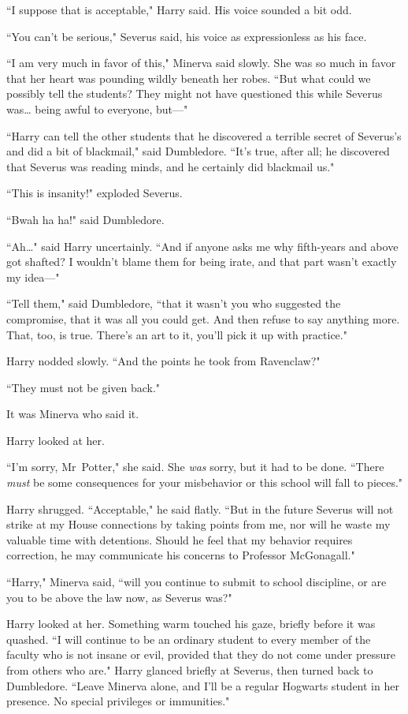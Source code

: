 ``I suppose that is acceptable," Harry said. His voice sounded a bit odd.

``You can't be serious," Severus said, his voice as expressionless as his face.

``I am very much in favor of this," Minerva said slowly. She was so much in favor that her heart was pounding wildly beneath her robes. ``But what could we possibly tell the students? They might not have questioned this while Severus was{\ldots} being awful to everyone, but—"

``Harry can tell the other students that he discovered a terrible secret of Severus's and did a bit of blackmail," said Dumbledore. ``It's true, after all; he discovered that Severus was reading minds, and he certainly did blackmail us."

``This is insanity!" exploded Severus.

``Bwah ha ha!" said Dumbledore.

``Ah{\ldots}" said Harry uncertainly. ``And if anyone asks me why fifth-years and above got shafted? I wouldn't blame them for being irate, and that part wasn't exactly my idea—"

``Tell them," said Dumbledore, ``that it wasn't you who suggested the compromise, that it was all you could get. And then refuse to say anything more. That, too, is true. There's an art to it, you'll pick it up with practice."

Harry nodded slowly. ``And the points he took from Ravenclaw?"

``They must not be given back."

It was Minerva who said it.

Harry looked at her.

``I'm sorry, Mr~Potter," she said. She \emph{was} sorry, but it had to be done. ``There \emph{must} be some consequences for your misbehavior or this school will fall to pieces."

Harry shrugged. ``Acceptable," he said flatly. ``But in the future Severus will not strike at my House connections by taking points from me, nor will he waste my valuable time with detentions. Should he feel that my behavior requires correction, he may communicate his concerns to Professor McGonagall."

``Harry," Minerva said, ``will you continue to submit to school discipline, or are you to be above the law now, as Severus was?"

Harry looked at her. Something warm touched his gaze, briefly before it was quashed. ``I will continue to be an ordinary student to every member of the faculty who is not insane or evil, provided that they do not come under pressure from others who are." Harry glanced briefly at Severus, then turned back to Dumbledore. ``Leave Minerva alone, and I'll be a regular Hogwarts student in her presence. No special privileges or immunities."


